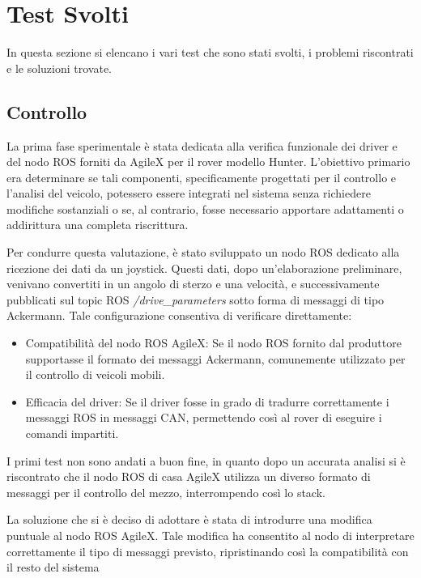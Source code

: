 \section{Test Svolti}
In questa sezione si elencano i vari test che sono stati svolti, i problemi riscontrati e le soluzioni trovate.

\subsection{Controllo}
La prima fase sperimentale è stata dedicata alla verifica funzionale dei driver e del nodo ROS forniti da AgileX per il rover modello Hunter. L'obiettivo primario era determinare se tali componenti, specificamente progettati per il controllo e l'analisi del veicolo, potessero essere integrati nel sistema senza richiedere modifiche sostanziali o se, al contrario, fosse necessario apportare adattamenti o addirittura una completa riscrittura.

\noindent Per condurre questa valutazione, è stato sviluppato un nodo ROS dedicato alla ricezione dei dati da un joystick. Questi dati, dopo un'elaborazione preliminare, venivano convertiti in un angolo di sterzo e una velocità, e successivamente pubblicati sul topic ROS \textit{/drive\_parameters} sotto forma di messaggi di tipo Ackermann. Tale configurazione consentiva di verificare direttamente:

\begin{itemize}
  \item Compatibilità del nodo ROS AgileX: Se il nodo ROS fornito dal produttore supportasse il formato dei messaggi Ackermann, comunemente utilizzato per il controllo di veicoli mobili.
  \item Efficacia del driver: Se il driver fosse in grado di tradurre correttamente i messaggi ROS in messaggi CAN, permettendo così al rover di eseguire i comandi impartiti.
\end{itemize}

\noindent I primi test non sono andati a buon fine, in quanto dopo un accurata analisi si è riscontrato che il nodo ROS di casa AgileX utilizza un diverso formato di messaggi per il controllo del mezzo, interrompendo così lo stack.

\noindent La soluzione che si è deciso di adottare è stata di introdurre una modifica puntuale al nodo ROS AgileX. Tale modifica ha consentito al nodo di interpretare correttamente il tipo di messaggi previsto, ripristinando così la compatibilità con il resto del sistema

